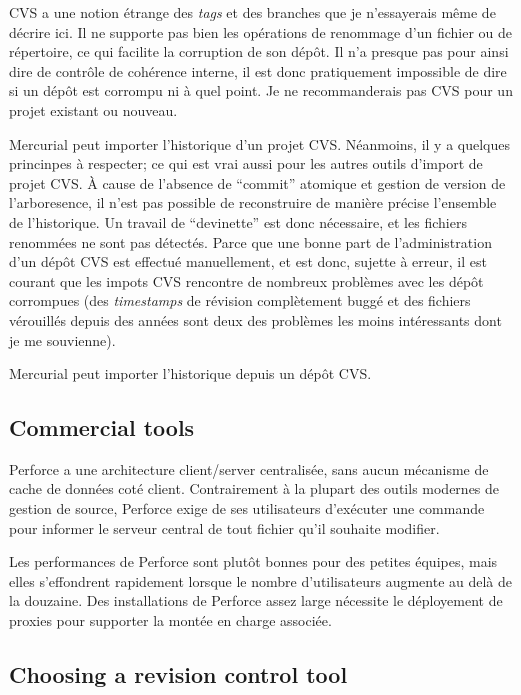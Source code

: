 CVS a une notion étrange des \textit{tags} et des branches que je n'essayerais
même de décrire ici. Il ne supporte pas bien les opérations de renommage d'un 
fichier ou de répertoire, ce qui facilite la corruption de son dépôt. Il n'a
presque pas pour ainsi dire de contrôle de cohérence interne, il est donc 
pratiquement impossible de dire si un dépôt est corrompu ni à quel point. Je
ne recommanderais pas CVS pour un projet existant ou nouveau.

Mercurial peut importer l'historique d'un projet CVS. Néanmoins, il y a 
quelques princinpes à respecter; ce qui est vrai aussi pour les autres
outils d'import de projet CVS. À cause de l'absence de ``commit'' atomique
et gestion de version de l'arboresence, il n'est pas possible de reconstruire
de manière précise l'ensemble de l'historique. Un travail de ``devinette''
est donc nécessaire, et les fichiers renommées ne sont pas détectés. Parce 
que une bonne part de l'administration d'un dépôt CVS est effectué manuellement, 
et est donc, sujette à erreur, il est courant que les impots CVS rencontre 
de nombreux problèmes avec les dépôt corrompues (des \textit{timestamps} 
de révision complètement buggé et des fichiers vérouillés depuis des années 
sont deux des problèmes les moins intéressants dont je me souvienne).

Mercurial peut importer l'historique depuis un dépôt CVS.

\subsection{Commercial tools}

Perforce a une architecture client/server centralisée, sans aucun
mécanisme de cache de données coté client. Contrairement à la plupart
des outils modernes de gestion de source, Perforce exige de ses 
utilisateurs d'exécuter une commande pour informer le serveur
central de tout fichier qu'il souhaite modifier.

Les performances de Perforce sont plutôt bonnes pour des petites
équipes, mais elles s'effondrent rapidement lorsque le nombre 
d'utilisateurs augmente au delà de la douzaine. Des installations 
de Perforce assez large nécessite le déployement de proxies pour 
supporter la montée en charge associée.

\subsection{Choosing a revision control tool}

